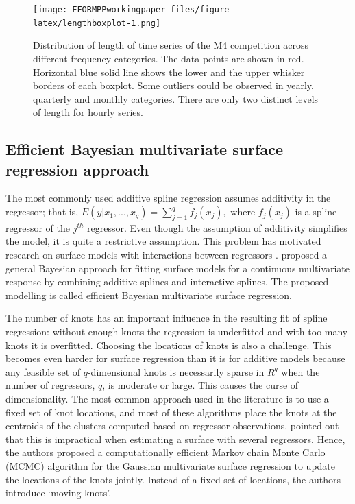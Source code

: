 \documentclass[11pt,a4paper,]{article}
\begin{document}
\begin{figure}
\centering
\texttt{[image: FFORMPPworkingpaper\_files/figure-latex/lengthboxplot-1.png]}
\caption{\label{fig:lengthboxplot}Distribution of length of time series of the M4 competition across different frequency categories. The data points are shown in red. Horizontal blue solid line shows the lower and the upper whisker borders of each boxplot. Some outliers could be observed in yearly, quarterly and monthly categories. There are only two distinct levels of length for hourly series.}
\end{figure}

\hypertarget{efficient-bayesian-multivariate-surface-regression-approach}{%
\subsection{Efficient Bayesian multivariate surface regression approach}\label{efficient-bayesian-multivariate-surface-regression-approach}}

The most commonly used additive spline regression assumes additivity in the regressor; that is, \(E(y|x_1, ..., x_q)=\sum_{j=1}^{q}f_j(x_j),\) where \(f_j(x_j)\) is a spline regressor of the \(j^{th}\) regressor. Even though the assumption of additivity simplifies the model, it is quite a restrictive assumption. This problem has motivated research on surface models with interactions between regressors \autocite{li2013efficient}. \textcite{li2013efficient} proposed a general Bayesian approach for fitting surface models for a continuous multivariate response by combining additive splines and interactive splines. The proposed modelling is called efficient Bayesian multivariate surface regression.

The number of knots has an important influence in the resulting fit of spline regression: without enough knots the regression is underfitted and with too many knots it is overfitted. Choosing the locations of knots is also a challenge. This becomes even harder for surface regression than it is for additive models because any feasible set of \(q\)-dimensional knots is necessarily sparse in \(R^q\) when the number of regressors, \(q\), is moderate or large. This causes the curse of dimensionality. The most common approach used in the literature is to use a fixed set of knot locations, and most of these algorithms place the knots at the centroids of the clusters computed based on regressor observations. \textcite{li2013efficient} pointed out that this is impractical when estimating a surface with several regressors. Hence, the authors proposed a computationally efficient Markov chain Monte Carlo (MCMC) algorithm for the Gaussian multivariate surface regression to update the locations of the knots jointly. Instead of a fixed set of locations, the authors introduce `moving knots'.
\end{document}
